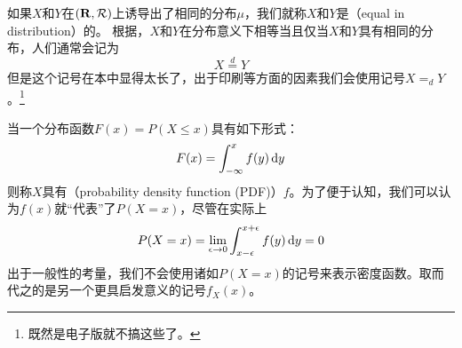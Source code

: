 \documentclass[../main.tex]{subfiles}
\begin{document}
如果\(X\)和\(Y\)在\((\mathbf{R},\mathcal{R})\)上诱导出了相同的分布\(\mu\)，我们就称\(X\)和\(Y\)是（equal in distribution）的。
根据，\(X\)和\(Y\)在分布意义下相等当且仅当\(X\)和\(Y\)具有相同的分布，人们通常会记为
\[X \stackrel{d}{=} Y\]
但是这个记号在本中显得太长了，出于印刷等方面的因素我们会使用记号\(X =_d Y\)。\footnote{既然是电子版就不搞这些了。}

当一个分布函数\(F(x) = P(X \leq x)\)具有如下形式：
\begin{equation}\label{eq:1.2.1}
	F(x) = \int_{-\infty}^{x}f(y) \dif y
\end{equation}
则称\(X\)具有（probability density function (PDF)）\(f\)。为了便于认知，我们可以认为\(f(x)\)就``代表''了\(P(X=x)\)，尽管在实际上
\[P(X = x) = \lim\limits_{\epsilon \rightarrow 0}\int_{x-\epsilon}^{x+\epsilon} f(y) \dif y = 0\]
出于一般性的考量，我们不会使用诸如\(P(X=x)\)的记号来表示密度函数。取而代之的是另一个更具启发意义的记号\(f_X(x)\)。
\end{document}
